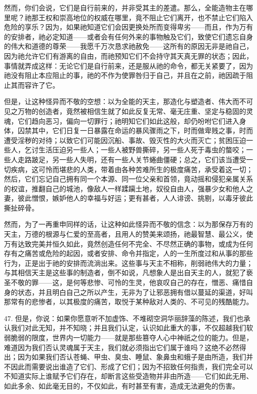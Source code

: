 然而，你们会说，它们是自行前来的，并非受其主的差遣。那么，全能造物主在哪里呢？祂那王权和崇高地位的权威在哪里，竟不阻止它们离开，也不禁止它们陷入危险的享乐？因为，如果祂知道它们会因更换处所而变得卑劣——而且，作为万有的安排者，祂必定知道——或者会有任何外来的事物触及它们，致使它们遗忘自身的伟大和道德的尊荣——我愿千万次恳求祂赦免——这所有的原因无非是祂自己，因为祂允许它们有游离的自由，而祂预知它们不会持守其天真无罪的状态；因此，事情就弄成这样：无论它们是自行前来，还是服从祂的命令，都无关紧要了，因为祂没有阻止本应阻止的事，祂的不作为使罪咎归于自己，并且在之前，祂因疏于阻止其而容许了它。\par

但是，让这种怪异而不敬的空想：以为全能的天主，那造化与塑造者、伟大而不可见之万物的创造者，竟然被相信生就了如此反复无常、毫无庄重、坚定与稳固的灵魂，它们趋向恶习，偏向一切罪行；祂明知它们如此这般，却仍吩咐它们进入身体，囚禁其中，它们日复一日暴露在命运的暴风骤雨之下，时而做卑贱之事，时而遭受淫秽的对待；以致它们可能因沉船、事故、毁灭性的大火而灭亡；贫困压迫一些人，乞讨生活压迫另一些人；一些人被野兽撕碎，另一些人死于毒虫的螫咬；一些人走路跛足，另一些人失明，还有一些人关节蜷曲僵硬；总之，它们该当遭受一切疾病，这可怜而堪悲的人类，带着由各种苦难所生的极度痛苦，承受着这一切；然后，它们忘记自己拥有同一个本源、同一位父亲和首领，竟动摇和侵犯亲属关系的权谊，推翻自己的城池，像敌人一样蹂躏土地，奴役自由人，强暴少女和他人之妻，彼此憎恨，嫉妒他人的幸福与好运；更有甚者，人人诽谤、挑剔，以毒牙彼此撕扯碎骨。\par

然而，为了一再重申同样的话，让这种如此怪异而不敬的信念：以为那保存万有的天主，万德的根源与仁爱的至高者，且用人的赞美来颂扬，祂最智慧、最公义，使万有达致完美并恒久如此，竟然创造任何不完全、不尽然正确的事物，或成为任何存有之痛苦或危险的起因，或者安排、命令并指定，人的一生所度过和从事的那些行为，正是出于祂的安排而流淌出来。这些事与天主不相称，削弱祂伟大的力量；与其相信天主是这些事的制造者，倒不如说，凡想象人是出自天主的人，就犯了亵圣不敬的罪——这，是何等悲惨、可怜的生灵，他哀叹自己的存在，憎恶、痛惜自身的状态，并且明白自己之所以产生，无非为了让邪恶拥有借以蔓延的渠道，好叫那常有的悲惨者，以其极度的痛苦，取悦于某种敌对人类的、不可见的残酷能力。\par

47. 但是，你说：如果你愿意听不加虚饰、不堆砌空洞华丽辞藻的陈述，我们也承认我们对此无知，并不知晓；并且我们认定，认识如此重大的事，不仅超越我们软弱脆弱的限度，世界内一切能力——就是那些篡夺人心中神祇之位的能力。但是，难道因为我们否认灵魂属于天主，我们就必须指出它们属于谁吗？这绝不必然得出；因为如果我们否认苍蝇、甲虫、臭虫、睡鼠、象鼻虫和蛾子是由所造，我们并不因此而需要说出谁造了它们、形成了它们；因为不招致任何指责，我们完全可以不知道实际上谁赋予它们存在，却断言这些受造物并非由所造——它们如此无用、如此多余、如此毫无目的，不仅如此，有时甚至有害，造成无法避免的伤害。\par

